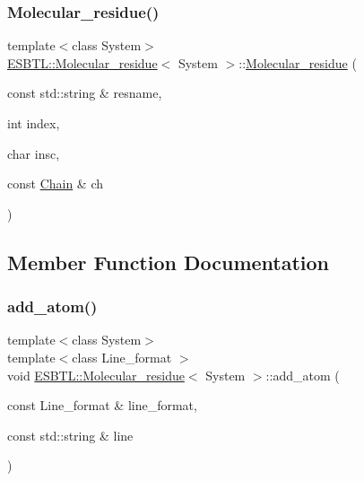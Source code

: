 \subsubsection{\texorpdfstring{Molecular\+\_\+residue()}{Molecular\_residue()}\hspace{0.1cm}{\footnotesize\ttfamily [2/2]}}
{\footnotesize\ttfamily template$<$class System$>$ \\
\hyperlink{classESBTL_1_1Molecular__residue}{E\+S\+B\+T\+L\+::\+Molecular\+\_\+residue}$<$ System $>$\+::\hyperlink{classESBTL_1_1Molecular__residue}{Molecular\+\_\+residue} (\begin{DoxyParamCaption}\item[{const std\+::string \&}]{resname,  }\item[{int}]{index,  }\item[{char}]{insc,  }\item[{const \hyperlink{classESBTL_1_1Molecular__residue_a3e18b15e0505f8b1c0d0bf200091698d}{Chain} \&}]{ch }\end{DoxyParamCaption})\hspace{0.3cm}{\ttfamily [inline]}}



\subsection{Member Function Documentation}
\mbox{\label{classESBTL_1_1Molecular__residue_a7414ddf8808e300c93f38c0f45bcca09}} 
\subsubsection{\texorpdfstring{add\+\_\+atom()}{add\_atom()}}
{\footnotesize\ttfamily template$<$class System$>$ \\
template$<$class Line\+\_\+format $>$ \\
void \hyperlink{classESBTL_1_1Molecular__residue}{E\+S\+B\+T\+L\+::\+Molecular\+\_\+residue}$<$ System $>$\+::add\+\_\+atom (\begin{DoxyParamCaption}\item[{const Line\+\_\+format \&}]{line\+\_\+format,  }\item[{const std\+::string \&}]{line }\end{DoxyParamCaption})\hspace{0.3cm}{\ttfamily [inline]}}


